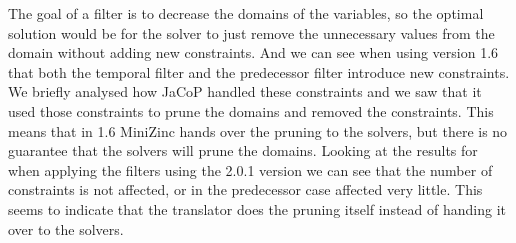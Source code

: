 The goal of a filter is to decrease the domains of the variables, so the optimal solution would be for the solver to just remove the unnecessary values from the domain without adding new constraints. And we can see when using version 1.6 that both the temporal filter and the predecessor filter introduce new constraints. We briefly analysed how JaCoP handled these constraints and we saw that it used those constraints to prune the domains and removed the constraints. This means that in 1.6 MiniZinc hands over the pruning to the solvers, but there is no guarantee that the solvers will prune the domains. Looking at the results for when applying the filters using the 2.0.1 version we can see that the number of constraints is not affected, or in the predecessor case affected very little. This seems to indicate that the translator does the pruning itself instead of handing it over to the solvers.



